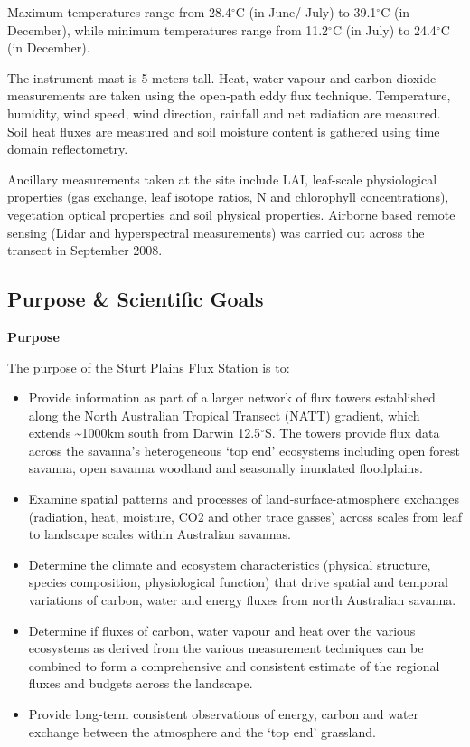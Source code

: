 \documentclass[11pt,a4paper]{article}
\begin{document}
Maximum temperatures range from 28.4$^\circ$C  (in June/ July) to 39.1$^\circ$C (in December), while minimum temperatures  range from 11.2$^\circ$C (in July) to 24.4$^\circ$C (in December).

The instrument mast is 5 meters  tall. Heat, water vapour and carbon dioxide measurements are taken using the  open-path eddy flux technique. Temperature, humidity, wind speed, wind  direction, rainfall and net radiation are measured. Soil heat fluxes are measured  and soil moisture content is gathered using time domain reflectometry.

Ancillary measurements taken at  the site include LAI, leaf-scale physiological properties (gas exchange, leaf  isotope ratios, N and chlorophyll concentrations), vegetation optical  properties and soil physical properties. Airborne based remote sensing (Lidar  and hyperspectral measurements) was carried out across the transect in  September 2008.

\subsection*{Purpose \& Scientific Goals}

\textbf{Purpose}

The  purpose of the Sturt Plains Flux Station is to:\textbf{}

\begin{itemize}
  \item Provide  information as part of a larger network of flux towers established along the  North Australian Tropical Transect (NATT) gradient, which extends \textasciitilde{}1000km  south from Darwin 12.5$^\circ$S.  The towers provide flux data across the savanna’s heterogeneous ‘top end’  ecosystems including open forest savanna, open savanna woodland and seasonally  inundated floodplains.
  \item Examine  spatial patterns and processes of land-surface-atmosphere exchanges (radiation,  heat, moisture, CO2 and other trace gasses) across scales from leaf to  landscape scales within Australian savannas.
  \item Determine  the climate and ecosystem characteristics (physical structure, species  composition, physiological function) that drive spatial and temporal variations  of carbon, water and energy fluxes from north Australian savanna.
  \item Determine  if fluxes of carbon, water vapour and heat over the various ecosystems as  derived from the various measurement techniques can be combined to form a  comprehensive and consistent estimate of the regional fluxes and budgets across  the landscape.
  \item Provide  long-term consistent observations of energy, carbon and water exchange between  the atmosphere and the ‘top end’ grassland.
\end{itemize}
\end{document}
